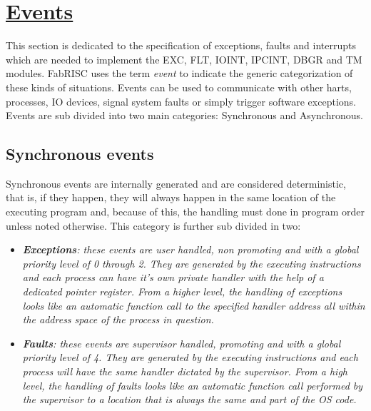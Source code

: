 \section[Events]{\LARGE\underline{Events}}

    \vspace{10pt}

    This section is dedicated to the specification of exceptions, faults and interrupts which are needed to implement the EXC, FLT, IOINT, IPCINT, DBGR and TM modules. FabRISC uses the term \textit{event} to indicate the generic categorization of these kinds of situations. Events can be used to communicate with other harts, processes, IO devices, signal system faults or simply trigger software exceptions. Events are sub divided into two main categories: Synchronous and Asynchronous.

    \subsection{Synchronous events}

        \vspace{10pt}

        Synchronous events are internally generated and are considered deterministic, that is, if they happen, they will always happen in the same location of the executing program and, because of this, the handling must done in program order unless noted otherwise. This category is further sub divided in two:

        \begin{itemize}

            \item \textit{\textbf{Exceptions}: these events are user handled, non promoting and with a global priority level of 0 through 2. They are generated by the executing instructions and each process can have it's own private handler with the help of a dedicated pointer register. From a higher level, the handling of exceptions looks like an automatic function call to the specified handler address all within the address space of the process in question.}

            \item \textit{\textbf{Faults}: these events are supervisor handled, promoting and with a global priority level of 4. They are generated by the executing instructions and each process will have the same handler dictated by the supervisor. From a high level, the handling of faults looks like an automatic function call performed by the supervisor to a location that is always the same and part of the OS code.}

        \end{itemize}

